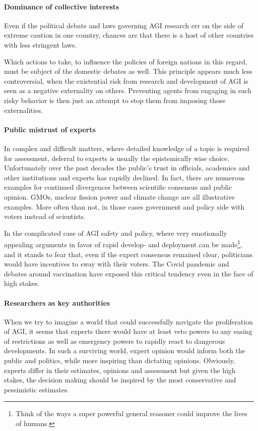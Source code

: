 \documentclass[12pt, a4paper]{article}
\begin{document}
			\paragraph{Dominance of collective interests}
				Even if the political debate and laws governing AGI research err on the side of extreme caution in one country, chances are that there is a host of other countries with less stringent laws.
				
				
				Which actions to take, to influence the policies of foreign nations in this regard, must be subject of the domestic debates as well.
				This principle appears much less controversial, when the existential risk from research and development of AGI is seen as a negative externality on others.
				Preventing agents from engaging in such risky behavior is then just an attempt to stop them from imposing those externalities.
				
				
			\paragraph{Public mistrust of experts}
				In complex and difficult matters, where detailed knowledge of a topic is required for assessment, deferral to experts is usually the epistemically wise choice.
				Unfortunately over the past decades the public's trust in officials, academics and other institutions and experts has rapidly declined.
				In fact, there are numerous examples for continued divergences between scientific consensus and public opinion.
				GMOs, nuclear fission power and climate change are all illustrative examples.
				More often than not, in those cases government and policy side with voters instead of scientists.
				
				In the complicated case of AGI safety and policy, where very emotionally appealing arguments in favor of rapid develop- and deployment can be made\footnote{Think of the ways a super powerful general reasoner could improve the lives of humans.}, and it stands to fear that, even if the expert consensus remained clear, politicians would have incentives to sway with their voters. 
				The Covid pandemic and debates around vaccination have exposed this critical tendency even in the face of high stakes.
					
			\paragraph{Researchers as key authorities}
				When we try to imagine a world that could successfully navigate the proliferation of AGI, it seems that experts there would have at least veto powers to any easing of restrictions as well as emergency powers to rapidly react to dangerous developments.
				In such a surviving world, expert opinion would inform both the public and politics, while more inspiring than dictating opinions.
				Obviously, experts differ in their estimates, opinions and assessment but given the high stakes, the decision making should be inspired by the most conservative and pessimistic estimates.
				
\end{document}
